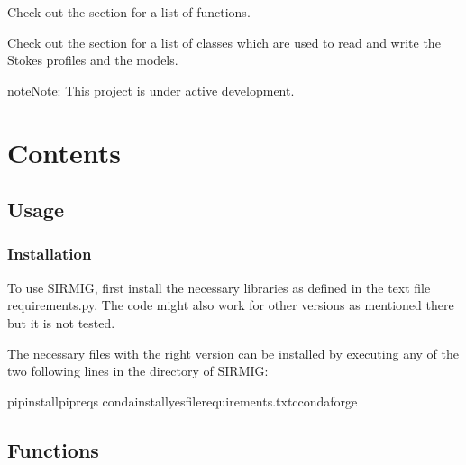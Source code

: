 \documentclass[letterpaper,10pt,english]{sphinxmanual}
\begin{document}
\sphinxAtStartPar
Check out the {\hyperref[\detokenize{functions::doc}]{}} section for a list of functions.

\sphinxAtStartPar
Check out the {\hyperref[\detokenize{classes::doc}]{}} section for a list of classes which are used to read and write the Stokes profiles and the models.

\begin{sphinxadmonition}{note}{Note:}
\sphinxAtStartPar
This project is under active development.
\end{sphinxadmonition}


\section{Contents}
\label{\detokenize{index:contents}}
\sphinxstepscope


\subsection{Usage}
\label{\detokenize{usage:usage}}\label{\detokenize{usage::doc}}

\subsubsection{Installation}
\label{\detokenize{usage:installation}}\label{\detokenize{usage:id1}}
\sphinxAtStartPar
To use SIR\sphinxhyphen{}MIG, first install the necessary libraries as defined in the text file requirements.py. The code might also work for other versions as mentioned there but it is not tested.

\sphinxAtStartPar
The necessary files with the right version can be installed by executing any of the two following lines in the directory of SIR\sphinxhyphen{}MIG:

\begin{sphinxVerbatim}[commandchars=\\\{\}]
 pipinstallpipreqs
 condainstall\PYGZhy{}\PYGZhy{}yes\PYGZhy{}\PYGZhy{}filerequirements.txt\PYGZhy{}cconda\PYGZhy{}forge
\end{sphinxVerbatim}

\sphinxstepscope


\subsection{Functions}
\label{\detokenize{functions:functions}}\label{\detokenize{functions::doc}}
\end{document}
